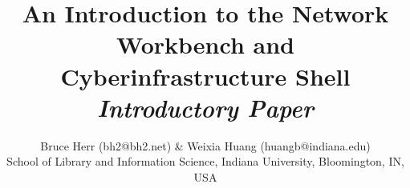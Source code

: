 \documentclass[10pt,letterpaper, twoside]{article}
\title{An Introduction to the Network Workbench and Cyberinfrastructure Shell \\
\textit{Introductory Paper}}
\author{Bruce Herr (bh2@bh2.net) & Weixia Huang (huangb@indiana.edu) \\
\small{School of Library and Information Science, Indiana University,
Bloomington, IN, USA}}
\date{}
\begin{document}
\maketitle

\begin{multicols*}{2}{







}
\end{multicols*}
\end{document}
